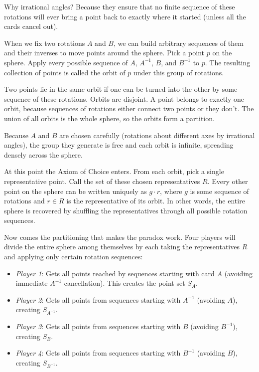 Why irrational angles? Because they ensure that no finite sequence of these rotations will ever bring a point back to exactly where it started (unless all the cards cancel out).

When we fix two rotations $A$ and $B$, we can build arbitrary sequences of them and their inverses to move points around the sphere. Pick a point $p$ on the sphere. Apply every possible sequence of $A$, $A^{-1}$, $B$, and $B^{-1}$ to $p$. The resulting collection of points is called the orbit of $p$ under this group of rotations.

Two points lie in the same orbit if one can be turned into the other by some sequence of these rotations. Orbits are disjoint. A point belongs to exactly one orbit, because sequences of rotations either connect two points or they don't. The union of all orbits is the whole sphere, so the orbits form a partition.

Because $A$ and $B$ are chosen carefully (rotations about different axes by irrational angles), the group they generate is free and each orbit is infinite, spreading densely across the sphere.

At this point the Axiom of Choice enters. From each orbit, pick a single representative point. Call the set of these chosen representatives $R$. Every other point on the sphere can be written uniquely as $g \cdot r$, where $g$ is some sequence of rotations and $r \in R$ is the representative of its orbit. In other words, the entire sphere is recovered by \QSOpen{}shuffling\QSClose{} the representatives through all possible rotation sequences. 

Now comes the partitioning that makes the paradox work. Four players will divide the entire sphere among themselves by each taking the representatives $R$ and applying only certain rotation sequences:

\begin{itemize}[leftmargin=*]
\item \textit{Player 1}: Gets all points reached by sequences starting with card $A$ (avoiding immediate $A^{-1}$ cancellation). This creates the point set $S_A$.
\item \textit{Player 2}: Gets all points from sequences starting with $A^{-1}$ (avoiding $A$), creating $S_{A^{-1}}$.
\item \textit{Player 3}: Gets all points from sequences starting with $B$ (avoiding $B^{-1}$), creating $S_B$.
\item \textit{Player 4}: Gets all points from sequences starting with $B^{-1}$ (avoiding $B$), creating $S_{B^{-1}}$.
\end{itemize}

